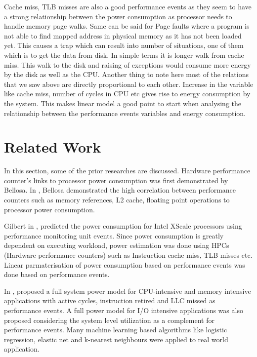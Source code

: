 Cache miss, TLB misses are also a good performance events as they seem to have a strong relationship between the power consumption as processor needs to handle memory page walks. Same can be said for Page faults where a program is not able to find mapped address in physical memory as it has not been loaded yet. This causes a trap which can result into number of situations, one of them which is to get the data from disk. In simple terms it is longer walk from cache miss. This walk to the disk and raising of exceptions would consume more energy by the disk as well as the CPU. Another thing to note here most of the relations that we saw above are directly proportional to each other. Increase in the variable like cache miss, number of cycles in CPU etc gives rise to energy consumption by the system. This makes linear model a good point to start when analysing the relationship between the performance events variables and energy consumption.

\section{Related Work}

In this section, some of the prior researches are discussed. Hardware performance counter's links to processor power consumption was first demonstrated by Bellosa. In \cite{bellosa2000benefits}, Bellosa demonstrated the high correlation between performance counters such as memory references, L2 cache, floating point operations to processor power consumption.

Gilbert in \cite{gilberto2005power}, predicted the power consumption for Intel XScale processors using performance monitoring unit events. Since power consumption is greatly dependent on executing workload, power estimation was done using HPCs (Hardware performance counters) such as Instruction cache miss, TLB misses etc. Linear parmaterisation of power consumption based on performance events was done based on performance events. 

In \cite{yang2016performance}, proposed a full system power model for CPU-intensive and memory intensive applications with active cycles, instruction retired and LLC missed as performance events. A full power model for I/O intensive applications was also proposed considering the system level utilization as a complement for performance events. Many machine learning based algorithms like logistic regression, elastic net and k-nearest neighbours were applied to real world application. 

